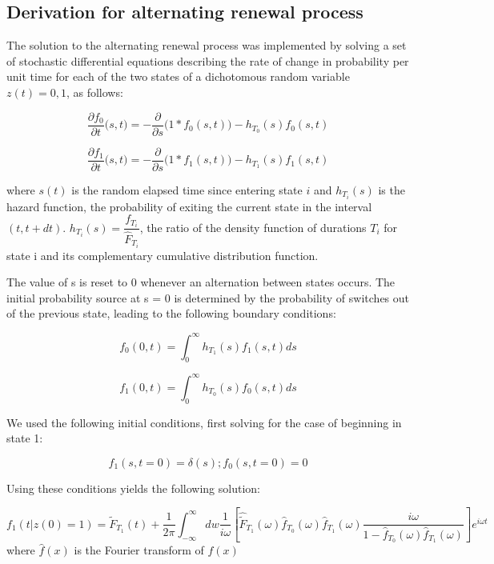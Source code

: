 \documentclass[10pt]{article}
\begin{document}
\subsection*{Derivation for alternating renewal process}
The solution to the alternating renewal process was implemented by solving a set of stochastic differential equations describing the rate of change in probability per unit time for each of the two states of a dichotomous random variable $z(t) = {0 , 1} $, as follows:

\begin{equation}
\frac{\partial f_0}{\partial t} \big(s,t\big) = -\frac{\partial}{\partial s}\big(1 * f_0(s,t)\big) - h_{T_0}(s) f_0(s,t)
\end{equation}

\begin{equation}
\frac{\partial f_1}{\partial t} \big(s,t\big) = -\frac{\partial}{\partial s} \big(1 * f_1(s,t)\big) - h_{T_1}(s) f_1(s,t)
\end{equation}

where $s(t)$ is the random elapsed time since entering state $i$ and $h_{T_i}(s)$ is the hazard function, the probability of exiting the current state in the interval $(t, t+dt)$. $h_{T_i}(s) = \dfrac{f_{T_i}}{\hat{F}_{T_i}}$, the ratio of the density function of durations $T_i$ for state i and its complementary cumulative distribution function.

The value of s is reset to 0 whenever an alternation between states occurs. The initial
probability source at s = 0 is determined by the probability of switches out of the previous state, leading to the following boundary conditions:

\begin{equation}
f_0(0,t) = \int_0^\infty h_{T_1}(s) f_1(s,t) ds
\end{equation}

\begin{equation}
f_1(0,t) = \int_0^\infty h_{T_0}(s) f_0(s,t) ds
\end{equation}

We used the following initial conditions, first solving for the case of beginning in state 1:

\begin{equation}
f_1(s,t=0) = \delta(s); f_0(s,t=0) = 0
\end{equation} 

Using these conditions yields the following solution:

\begin{equation}
f_{1}(t|z(0)=1) = \tilde{F}_{T_1}(t) + \frac{1}{2\pi} \int_{-\infty}^\infty dw \frac{1}{i\omega} \left[ \hat{\tilde{F}}_{T_1}(\omega) \hat{f}_{T_0}(\omega)\hat{f}_{T_1}(\omega) \frac{i\omega}{1 - \hat{f}_{T_0}(\omega)\hat{f}_{T_1}(\omega)} \right] e^{i \omega t}
\end{equation}
where $\hat{f}(x)$ is the Fourier transform of $f(x)$
\end{document}
